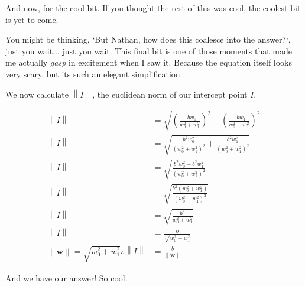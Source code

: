 \documentclass[a4paper]{article}
\newcommand{\norm}[1]{\left\lVert#1\right\rVert}
\begin{document}
And now, for the cool bit. If you thought the rest of this was cool, the coolest bit is yet to come.

You might be thinking, `But Nathan, how does this coalesce into the answer?`, just you wait... just you wait.
This final bit is one of those moments that made me actually \textit{gasp} in excitement when I saw it. Because the
equation itself looks very scary, but its such an elegant simplification.

We now calculate $\norm{I}$, the euclidean norm of our intercept point $I$.

\begin{equation}\begin{split}
		\norm{I} &= \sqrt{
			\left(\frac{-bw_0}{w_0^2+w_1^2}\right)^2+\left(\frac{-bw_1}{w_0^2+w_1^2}\right)^2
		} \\
		\norm{I} &= \sqrt{
			\frac{b^2w_0^2}{\left(w_0^2+w_1^2\right)^2}+\frac{b^2w_1^2}{\left(w_0^2+w_1^2\right)^2}
		} \\
		\norm{I} &= \sqrt{
			\frac{b^2w_0^2+b^2w_1^2}{\left(w_0^2+w_1^2\right)^2}
		} \\
		\norm{I} &= \sqrt{
			\frac{b^2\left(w_0^2+w_1^2\right)}{\left(w_0^2+w_1^2\right)^2}
		} \\
		\norm{I} &= \sqrt{
			\frac{b^2}{w_0^2+w_1^2}
		} \\
		\norm{I} &= \frac{b}{\sqrt{w_0^2+w_1^2}} \\
		\norm{\mathbf{w}}=\sqrt{w_0^2+w_1^2} \therefore \norm{I} &= \frac{b}{\norm{\mathbf{w}}}
	\end{split}\end{equation}

And we have our answer! So cool.
\end{document}
